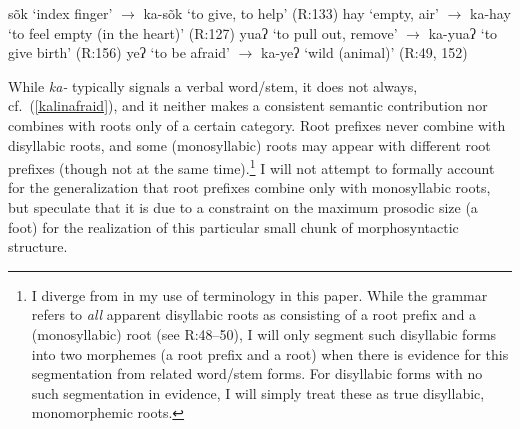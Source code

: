 \documentclass[output=paper]{langscibook}
\begin{document}
\ea\label{kalinrps}  
\ea s\~ok `index finger' $\rightarrow$ {ka}-s\~ok `to give, to help' \hfill (R:133)
\ex hay `empty, air' $\rightarrow$ {ka}-hay `to feel empty (in the heart)' \hfill (R:127)
\ex yuaʔ `to pull out, remove' $\rightarrow$ {ka}-yuaʔ `to give birth' \hfill (R:156)
\ex yeʔ `to be afraid' $\rightarrow$ {ka}-yeʔ `wild (animal)' \hfill (R:49, 152)\label{kalinafraid}
\z
\z

\noindent While \textit{ka-} typically signals a verbal word/stem, it does not always, cf.\ (\ref{kalinafraid}), and it neither makes a consistent semantic contribution nor combines with roots only of a certain category. Root prefixes never combine with disyllabic roots, and some (monosyllabic) roots may appear with different root prefixes (though not at the same time).\footnote{I diverge from \citealt{Rad81} in my use of terminology in this paper. While the grammar refers to \textit{all} apparent disyllabic roots as consisting of a root prefix and a (monosyllabic) root (see R:48--50), I will only segment such disyllabic forms into two morphemes (a root prefix and a root) when there is evidence for this segmentation from related word/stem forms. For disyllabic forms with no such segmentation in evidence, I will simply treat these as true disyllabic, monomorphemic roots.} I will not attempt to formally account for the generalization that root prefixes combine only with monosyllabic roots, but speculate that it is due to a constraint on the maximum prosodic size (a foot) for the realization of this particular small chunk of morphosyntactic structure.\largerpage
\end{document}
